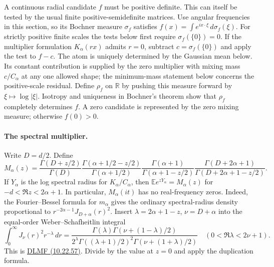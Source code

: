 \documentclass[11pt,a4paper]{article}
\numberwithin{equation}{section}
\begin{document}
A continuous radial candidate $f$ must be positive definite. This can
itself be tested by the usual finite positive-semidefinite matrices.
Use angular frequencies in this section, so its Bochner measure $\sigma_f$
satisfies $f(x)=\int e^{i x\cdot\xi}\,d\sigma_f(\xi)$.
For strictly positive finite scales the tests below first require $\sigma_f(\{0\})=0$. If the multiplier formulation $K_\alpha(rx)$ admits $r=0$, subtract $c=\sigma_f(\{0\})$ and apply the test to $f-c$. The atom is uniquely determined by the Gaussian mean below. Its constant contribution is supplied by the zero multiplier with mixing mass $c/C_\alpha$ at any one allowed shape; the minimum-mass statement below concerns the positive-scale residual.
Define $\rho_f$ on $\mathbb R$ by pushing this measure forward by
$\xi\mapsto\log|\xi|$. Isotropy and uniqueness in Bochner's theorem show
that $\rho_f$ completely determines $f$. A zero candidate is represented
by the zero mixing measure; otherwise $f(0)>0$.

\paragraph{The spectral multiplier.}
Write $D=d/2$. Define
\begin{equation}\label{eq:ball-Mellin}
 M_\alpha(z)=
 \frac{\Gamma(D+z/2)}{\Gamma(D)}
 \frac{\Gamma(\alpha+1/2-z/2)}{\Gamma(\alpha+1/2)}
 \frac{\Gamma(\alpha+1)}{\Gamma(\alpha+1-z/2)}
 \frac{\Gamma(D+2\alpha+1)}{\Gamma(D+2\alpha+1-z/2)} .
\end{equation}
If $Y_\alpha$ is the log spectral radius for $K_\alpha/C_\alpha$, then
$\mathbb E e^{zY_\alpha}=M_\alpha(z)$ for $-d<\Re z<2\alpha+1$.
In particular, $M_\alpha(it)$ has no real-frequency zeros.
Indeed, the Fourier--Bessel formula for $m_\alpha$
\cite[Corollary 3.3 and its proof]{JMR2009} gives the ordinary
spectral-radius density proportional to
$r^{-2\alpha-1}J_{D+\alpha}(r)^2$. Insert
$\lambda=2\alpha+1-z$, $\nu=D+\alpha$ into the equal-order
Weber--Schafheitlin integral
\[
 \int_0^\infty J_\nu(r)^2 r^{-\lambda}\,dr
 =\frac{\Gamma(\lambda)\Gamma(\nu+(1-\lambda)/2)}
 {2^\lambda\Gamma((\lambda+1)/2)^2\Gamma(\nu+(1+\lambda)/2)}
 \quad (0<\Re\lambda<2\nu+1).
\]
This is \href{https://dlmf.nist.gov/10.22.E57}{DLMF (10.22.57)}.
Divide by the value at $z=0$ and apply the duplication formula.
\end{document}
